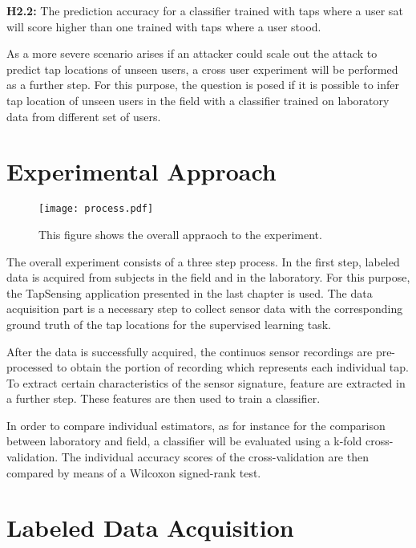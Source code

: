 \begin{center}
  \begin{framed}
    \textbf{H2.2:} The prediction accuracy for a classifier trained with taps where a user sat will score higher than one trained with taps where a user stood.
  \end{framed}
\end{center}

As a more severe scenario arises if an attacker could scale out the attack to predict tap locations of unseen users, a cross user experiment will be performed as a further step. For this purpose, the question is posed if it is possible to infer tap location of unseen users in the field with a classifier trained on laboratory data from different set of users.

\section{Experimental Approach}

\begin{figure}[h!]
  \centering
  \texttt{[image: process.pdf]}
  \caption{This figure shows the overall appraoch to the experiment.} \label{fig:appraoch}
\end{figure}

The overall experiment consists of a three step process. In the first step, labeled data is acquired from subjects in the field and in the laboratory. For this purpose, the TapSensing application presented in the last chapter is used. The data acquisition part is a necessary step to collect sensor data with the corresponding ground truth of the tap locations for the supervised learning task. 

After the data is successfully acquired, the continuos sensor recordings are pre-processed to obtain the portion of recording which represents each individual tap. To extract certain characteristics of the sensor signature, feature are extracted in a further step. These features are then used to train a classifier.

In order to compare individual estimators, as for instance for the comparison between laboratory and field, a classifier will be evaluated using a k-fold cross-validation. The individual accuracy scores of the cross-validation are then compared by means of a Wilcoxon signed-rank test.

\section{Labeled Data Acquisition}

